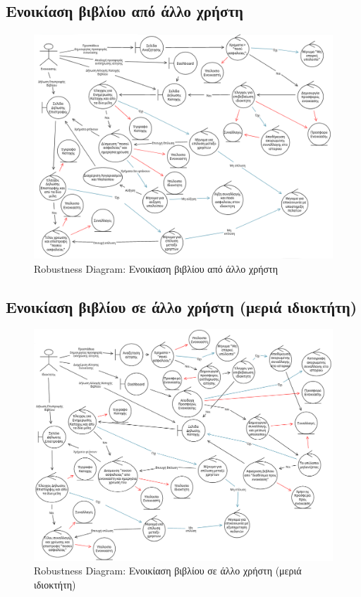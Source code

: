 \documentclass[12pt,a4paper]{article}
\begin{document}
\subsection{Ενοικίαση βιβλίου από άλλο χρήστη}
\begin{figure}[H]
	\includegraphics[width=\textwidth]{Rent from User Robustness.png}
	\caption{Robustness Diagram: Ενοικίαση βιβλίου από άλλο χρήστη}
	\label{Robustness Diagram: Ενοικίαση βιβλίου από άλλο χρήστη}
\end{figure}

\subsection{Ενοικίαση βιβλίου σε άλλο χρήστη (μεριά ιδιοκτήτη)}
\begin{figure}[H]
	\includegraphics[width=\textwidth]{Rent to User Robustness.png}
	\caption{Robustness Diagram: Ενοικίαση βιβλίου σε άλλο χρήστη (μεριά ιδιοκτήτη)}
	\label{Robustness Diagram: Ενοικίαση βιβλίου σε άλλο χρήστη μεριά ιδιοκτήτη}
\end{figure}
\end{document}

